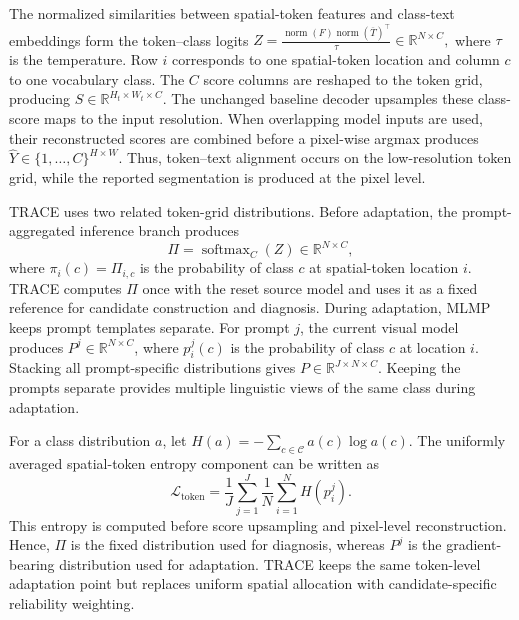 \documentclass[letterpaper]{article}
\begin{document}
	The normalized similarities between spatial-token features and class-text embeddings form the token--class logits
	$
	Z
	=
	\frac{
		\operatorname{norm}(F)
		\operatorname{norm}(\overline T)^\top
	}{\tau}
	\in
	\mathbb{R}^{N\times C},
	$
	where $\tau$ is the temperature. Row $i$ corresponds to one spatial-token location and column $c$ to one vocabulary class. The $C$ score columns are reshaped to the token grid, producing $S\in\mathbb{R}^{H_t\times W_t\times C}$. The unchanged baseline decoder upsamples these class-score maps to the input resolution. When overlapping model inputs are used, their reconstructed scores are combined before a pixel-wise argmax produces $\widehat Y\in\{1,\ldots,C\}^{H\times W}$. Thus, token--text alignment occurs on the low-resolution token grid, while the reported segmentation is produced at the pixel level.
	
	TRACE uses two related token-grid distributions. Before adaptation, the prompt-aggregated inference branch produces
	\begin{equation}
		\Pi
		=
		\operatorname{softmax}_{C}(Z)
		\in
		\mathbb{R}^{N\times C},
	\end{equation}
	where $\pi_i(c)=\Pi_{i,c}$ is the probability of class $c$ at spatial-token location $i$. TRACE computes $\Pi$ once with the reset source model and uses it as a fixed reference for candidate construction and diagnosis. During adaptation, MLMP keeps prompt templates separate. For prompt $j$, the current visual model produces $P^j\in\mathbb{R}^{N\times C}$, where $p_i^j(c)$ is the probability of class $c$ at location $i$. Stacking all prompt-specific distributions gives $P\in\mathbb{R}^{J\times N\times C}$. Keeping the prompts separate provides multiple linguistic views of the same class during adaptation.
	
	For a class distribution $a$, let $H(a)=-\sum_{c\in\mathcal C}a(c)\log a(c)$. The uniformly averaged spatial-token entropy component can be written as
	\begin{equation}
		\mathcal L_{\mathrm{token}}
		=
		\frac{1}{J}
		\sum_{j=1}^{J}
		\frac{1}{N}
		\sum_{i=1}^{N}
		H(p_i^j).
	\end{equation}
	This entropy is computed before score upsampling and pixel-level reconstruction. Hence, $\Pi$ is the fixed distribution used for diagnosis, whereas $P^j$ is the gradient-bearing distribution used for adaptation. TRACE keeps the same token-level adaptation point but replaces uniform spatial allocation with candidate-specific reliability weighting.
	
\end{document}
